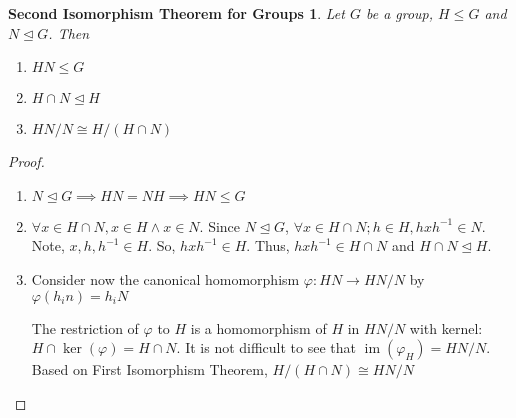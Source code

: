 \documentclass{article}
\newtheorem*{thm}{Second Isomorphism Theorem for Groups}
\theoremstyle{definition}\newtheorem{definition}{Definition}
\begin{document}
	\begin{thm}
		Let $G$ be a group, $H \leq G$ and $N \unlhd G$. Then
		\begin{enumerate}
			\item $HN \leq G$
			\item $H \cap N \unlhd H$
			\item $ HN / N \cong H / ( H \cap N )$
		\end{enumerate}
	\end{thm}
	\begin{proof}\
		\begin{enumerate}
			\item $N \unlhd G \implies HN=NH \implies HN \leq G$
			\item $\forall x \in H \cap N, x \in H \land x \in N.$ Since $N \unlhd G$, $\forall x \in H \cap N; h \in H, hxh^{-1} \in N$. Note, $x,h,h^{-1} \in H$. So, $hxh^{-1} \in H$. Thus, $hxh^{-1} \in H \cap N$ and $H \cap N \unlhd H$.
			\item Consider now the canonical homomorphism $\varphi : HN \longrightarrow HN / N$ by $\varphi(h_in)=h_iN$
			
					The restriction of $\varphi$ to $H$ is a homomorphism of $H$ in $HN / N$ with kernel: $H \cap \operatorname { ker } ( \varphi )=H \cap N $. It is not difficult to see that $\operatorname { im } ( \varphi_{H} )=HN/N$. Based on First Isomorphism Theorem, $   H / ( H \cap N ) \cong HN / N$
		\end{enumerate}
	\end{proof}
			
\end{document}
